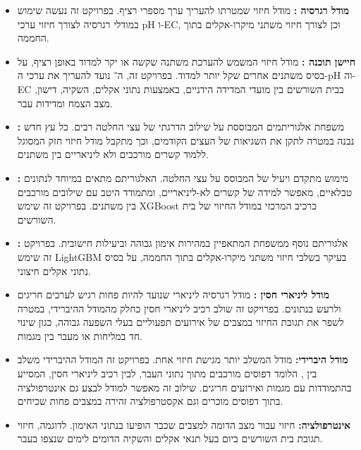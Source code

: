 \begin{itemize}
\item \textbf{\color{ruppinblue}מודל רגרסיה :} מודל חיזוי שמטרתו להעריך ערך מספרי רציף. בפרויקט זה נעשה שימוש במודלי רגרסיה לצורך חיזוי ערכי pH ו-EC, וכן לצורך חיזוי משתני מיקרו-אקלים בתוך החממה.

\item \textbf{\color{ruppinblue}חיישן תוכנה :} מודל חיזוי המשמש להערכת משתנה שקשה או יקר למדוד באופן רציף, על בסיס משתנים אחרים שקל יותר למדוד. בפרויקט זה, ה־\SoftSensor{} נועד להעריך את ערכי ה-pH וה-EC בבית השורשים בין מועדי המדידה הידניים, באמצעות נתוני אקלים, השקיה, דישון, מצב הצמח ומדידות עבר.

\item \textbf{\color{ruppinblue}\GB{}:} משפחת אלגוריתמים המבוססת על שילוב הדרגתי של עצי החלטה רבים. כל עץ חדש נבנה במטרה לתקן את השגיאות של העצים הקודמים, וכך מתקבל מודל חיזוי חזק המסוגל ללמוד קשרים מורכבים ולא ליניאריים בין משתנים.

\item \textbf{\color{ruppinblue}:} מימוש מתקדם ויעיל של \GB{} המבוסס על עצי החלטה. האלגוריתם מתאים במיוחד לנתונים טבלאיים, מאפשר למידה של קשרים לא-ליניאריים, ומתמודד היטב עם שילובים מורכבים בין משתנים. בפרויקט זה שימש XGBoost כרכיב המרכזי במודל החיזוי של בית השורשים.

\item \textbf{\color{ruppinblue}:} אלגוריתם נוסף ממשפחת \GB{} המתאפיין במהירות אימון גבוהה וביעילות חישובית. בפרויקט זה שימש LightGBM בעיקר בשלבי חיזוי משתני מיקרו-אקלים בתוך החממה, על בסיס נתוני אקלים חיצוני.

\item \textbf{\color{ruppinblue}מודל ליניארי חסין :} מודל רגרסיה ליניארי שנועד להיות פחות רגיש לערכים חריגים ולרעש בנתונים. בפרויקט זה שולב רכיב ליניארי חסין כחלק מהמודל ההיברידי, במטרה לשפר את תגובת החיזוי במצבים של אירועים תפעוליים בעלי השפעה גבוהה, כגון שינוי חד במליחות או מעבר בין מגמות.

\item \textbf{\color{ruppinblue}מודל היברידי:} מודל המשלב יותר מגישת חיזוי אחת. בפרויקט זה המודל ההיברידי משלב בין \GB{}, הלומד דפוסים מורכבים מתוך נתוני העבר, לבין רכיב ליניארי חסין, המסייע בהתמודדות עם מגמות ואירועים חריגים. שילוב זה מאפשר למודל לבצע גם אינטרפולציה בתוך דפוסים מוכרים וגם אקסטרפולציה זהירה במצבים פחות שכיחים.

\item \textbf{\color{ruppinblue}אינטרפולציה:} חיזוי עבור מצב הדומה למצבים שכבר הופיעו בנתוני האימון. לדוגמה, חיזוי תגובת בית השורשים ביום בעל תנאי אקלים והשקיה הדומים לימים שנצפו בעבר.


\end{itemize}
